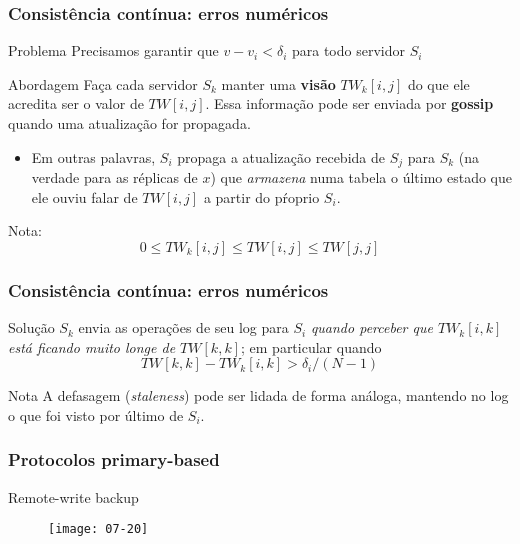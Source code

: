\documentclass[Ligatures=TeX,table,brazil,svgnames,usetotalslideindicator,compress,10pt]{beamer}
\begin{document}
\begin{frame}
  \frametitle{Consistência contínua: erros numéricos}
  \begin{alertblock}{Problema}
    Precisamos garantir que $v - v_i < \delta_i$ para todo servidor $S_i$
  \end{alertblock}

  \pause
  \begin{block}{Abordagem}
    Faça cada servidor $S_k$ manter uma \textbf{visão} $TW_k[i,j]$ do
    que ele acredita ser o valor de $TW[i,j]$. Essa informação pode
    ser enviada por \textbf{gossip} quando uma atualização for
    propagada.
    \begin{itemize}
    \item Em outras palavras, $S_i$ propaga a atualização recebida de
      $S_j$ para $S_k$ (na verdade para as réplicas de $x$) que
      \emph{armazena} numa tabela o último estado que ele ouviu falar
      de $TW[i,j]$ a partir do pŕoprio $S_i$.
    \end{itemize}
  \end{block}

  \pause
  \begin{alertblock}{Nota:}
    \[0 \leq TW_k[i,j] \leq TW[i,j] \leq TW[j,j]\]
  \end{alertblock}
\end{frame}

\begin{frame}
  \frametitle{Consistência contínua: erros numéricos}
  \begin{block}{Solução}
    $S_k$ envia as operações de seu log para $S_i$ \emph{quando
      perceber que $TW_k[i,k]$ está ficando muito longe de $TW[k,k]$};
      em particular quando \[TW[k,k] - TW_k[i,k] > \delta_i/(N-1)\]
  \end{block}

  \pause
  \begin{alertblock}{Nota}
    A defasagem (\textit{staleness}) pode ser lidada de forma análoga, mantendo no log o que foi visto por último de $S_i$.
  \end{alertblock}
\end{frame}

\begin{frame}
  \frametitle{Protocolos primary-based}
  \begin{block}{Remote-write backup}
    \begin{figure}
      \centering
      \texttt{[image: 07-20]}
    \end{figure}
  \end{block}
\end{frame}
\end{document}
